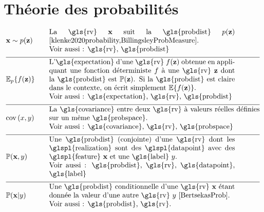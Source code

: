 \newpage
\section*{Théorie des probabilités} 

\begin{align}
	&\featurevec \sim p(\vz) & \quad & \parbox{.75\textwidth}{
		La \gls{rv} $\featurevec$ suit la \gls{probdist} $p(\vz)$ \cite{klenke2020probability,BillingsleyProbMeasure}. \\
		Voir aussi : \gls{rv}, \gls{probdist}
	} \nonumber \\[2mm] \hline \nonumber\\[-5mm]    
	&\expect_{p} \{ f(\datapoint) \} & \quad & \parbox{.75\textwidth}{
		L'\gls{expectation} d'une \gls{rv} $f(\datapoint)$ obtenue en appliquant une fonction déterministe $f$ à une \gls{rv} 
		$\datapoint$ dont la \gls{probdist} est $\prob{\datapoint}$. Si la \gls{probdist} est claire dans le contexte, 
		on écrit simplement $\expect \{ f(\datapoint) \}$. \\
		Voir aussi : \gls{expectation}, \gls{rv}, \gls{probdist}
	} \nonumber \\[2mm] \hline \nonumber\\[-5mm]
	&\cov{x}{y} & \quad & \parbox{.85\textwidth}{
		La \gls{covariance} entre deux \gls{rv} à valeurs réelles définies 
		sur un même \gls{probspace}. \\
		Voir aussi : \gls{covariance}, \gls{rv}, \gls{probspace}
	} \nonumber \\[2mm] \hline \nonumber\\[-5mm]     
	&\prob{\featurevec,\truelabel} & \quad & \parbox{.75\textwidth}{
		Une \gls{probdist} (conjointe) d'une \gls{rv} 
		dont les \glspl{realization} sont des \glspl{datapoint} avec des \glspl{feature} $\featurevec$ et une \gls{label} $\truelabel$. \\
		Voir aussi : \gls{probdist}, \gls{rv}, \gls{datapoint}, \gls{label}
	} \nonumber \\[2mm] \hline \nonumber\\[-5mm]        
	&\prob{\featurevec|\truelabel} & \quad & \parbox{.75\textwidth}{
		Une \gls{probdist} conditionnelle d'une \gls{rv} 
		$\featurevec$ étant donnée la valeur d'une autre \gls{rv} $\truelabel$ \cite[Sec.\ 3.5]{BertsekasProb}. \\
		Voir aussi : \gls{probdist}, \gls{rv}.
	} \nonumber                                             
\end{align}

